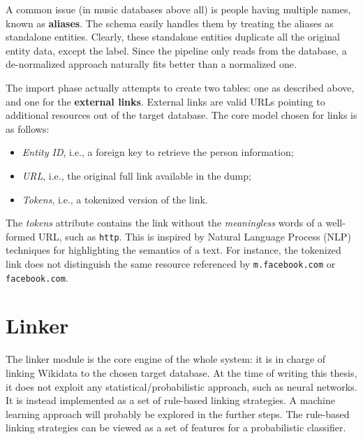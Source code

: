 A common issue (in music databases above all) is people having multiple names, known as \textbf{aliases}. The schema easily handles them by treating the aliases as standalone entities. Clearly, these standalone entities duplicate all the original entity data, except the label. Since the pipeline only reads from the database, a de-normalized approach naturally fits better than a normalized one.

The import phase actually attempts to create two tables: one as described above, and one for the \textbf{external links}. External links are valid URLs pointing to additional resources out of the target database. The core model chosen for links is as follows:
\begin{itemize}
    \item \textit{Entity ID}, i.e., a foreign key to retrieve the person information;
    \item \textit{URL}, i.e., the original full link available in the dump;
    \item \textit{Tokens}, i.e., a tokenized version of the link.
\end{itemize}
The \textit{tokens} attribute contains the link without the \textit{meaningless} words of a well-formed URL, such as \texttt{http}. This is inspired by Natural Language Process (NLP) techniques for highlighting the semantics of a text. For instance, the tokenized link does not distinguish the same resource referenced by \texttt{m.facebook.com} or \texttt{facebook.com}.


\section{Linker}
\label{cha:42}
The linker module is the core engine of the whole system: it is in charge of linking Wikidata to the chosen target database. At the time of writing this thesis, it does not exploit any statistical/probabilistic approach, such as neural networks. It is instead implemented as a set of rule-based linking strategies. A machine learning approach will probably be explored in the further steps. The rule-based linking strategies can be viewed as a set of features for a probabilistic classifier.

